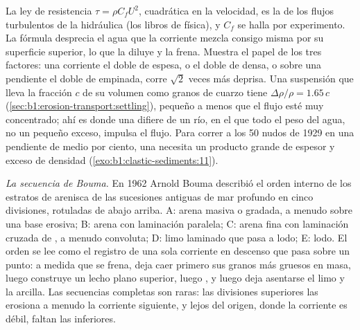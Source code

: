 La ley de resistencia $\tau = \rho C_f U^2$, cuadrática en la velocidad, es la de los flujos turbulentos de la hidráulica (los libros de física), y $C_f$ se halla por experimento. La fórmula
desprecia el agua que la corriente mezcla consigo misma por su superficie superior, lo que la diluye y la frena. Muestra el papel de los tres factores: una corriente el doble de espesa, o el doble de
densa, o sobre una pendiente el doble de empinada, corre $\sqrt 2$ veces más deprisa. Una suspensión que lleva la fracción $c$ de su volumen como granos de cuarzo tiene
$\Delta\rho/\rho = 1.65\,c$ (\cref{sec:b1:erosion-transport:settling}), pequeño a menos que el flujo esté muy concentrado; ahí es donde una  difiere de un río, en el que
todo el peso del agua, no un pequeño exceso, impulsa el flujo. Para correr a los 50 nudos de 1929 en una pendiente de medio por ciento, una  necesita un producto grande
de espesor y exceso de densidad (\cref{exo:b1:clastic-sediments:11}).

\emph{La secuencia de Bouma.} En 1962 Arnold Bouma describió el orden interno de los estratos de arenisca de las sucesiones antiguas de mar profundo en cinco divisiones, rotuladas de abajo
arriba. A: arena masiva o gradada, a menudo sobre una base erosiva; B: arena con laminación paralela; C: arena fina con laminación cruzada de , a menudo convoluta; D: limo laminado que
pasa a lodo; E: lodo. El orden se lee como el registro de una sola corriente en descenso que pasa sobre un punto: a medida que se frena, deja caer primero sus granos más gruesos en masa,
luego construye un lecho plano superior, luego , y luego deja asentarse el limo y la arcilla. Las secuencias completas son raras: las divisiones superiores las erosiona a menudo la
corriente siguiente, y lejos del origen, donde la corriente es débil, faltan las inferiores.


